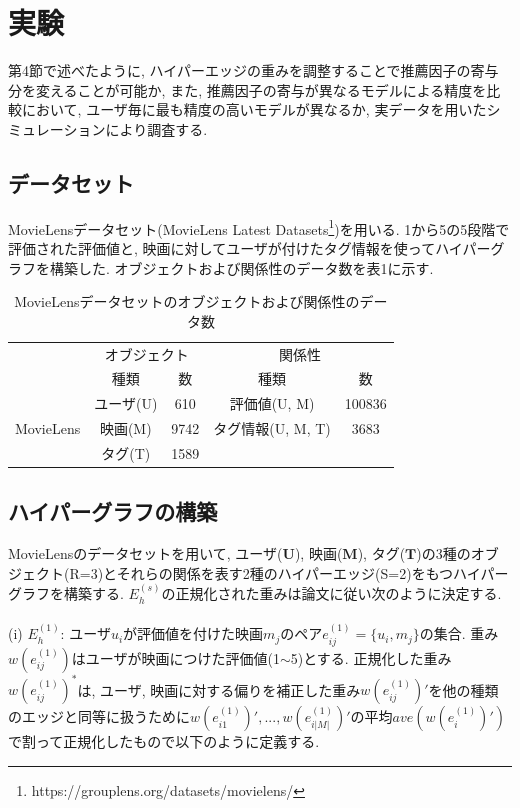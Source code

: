 \documentclass[a4j,11pt]{jarticle}           %
\begin{document}
	\section{実験}
	第4節で述べたように, ハイパーエッジの重みを調整することで推薦因子の寄与分を変えることが可能か, また, 推薦因子の寄与が異なるモデルによる精度を比較において, ユーザ毎に最も精度の高いモデルが異なるか, 実データを用いたシミュレーションにより調査する.
	\subsection{データセット}
	MovieLensデータセット(MovieLens Latest Datasets\footnote{https://grouplens.org/datasets/movielens/})を用いる. 1から5の5段階で評価された評価値と, 映画に対してユーザが付けたタグ情報を使ってハイパーグラフを構築した. オブジェクトおよび関係性のデータ数を表1に示す.%
	
	\begin{table}[H]
		\centering
		\caption{MovieLensデータセットのオブジェクトおよび関係性のデータ数}
		\begin{tabular}{ccccc}\hline
			&\multicolumn{2}{c}{オブジェクト}&\multicolumn{2}{c}{関係性}　\\
			&種類&数&種類&数 \\ \hline
			&ユーザ(U)&610&評価値(U, M)&100836\\
			MovieLens&映画(M)&9742&タグ情報(U, M, T)&3683\\
			&タグ(T)&1589\\ \hline
		\end{tabular}
	\end{table}
	
	\subsection{ハイパーグラフの構築}
	MovieLensのデータセットを用いて, ユーザ($\textbf{U}$), 映画($\textbf{M}$), タグ($\textbf{T}$)の3種のオブジェクト(R=3)とそれらの関係を表す2種のハイパーエッジ(S=2)をもつハイパーグラフを構築する. $E_h^{(s)}$の正規化された重みは論文\cite{MRH}に従い次のように決定する. 
	\\\\(i) $E_h^{(1)}$: ユーザ$u_i$が評価値を付けた映画$m_j$のペア$e^{(1)}_{ij}=\{u_i,m_j\}$の集合. 重み$w(e_{ij}^{(1)})$はユーザが映画につけた評価値(1$\sim$5)とする. 正規化した重み$w(e_{ij}^{(1)})^*$は, ユーザ, 映画に対する偏りを補正した重み$w(e_{ij}^{(1)})'$を他の種類のエッジと同等に扱うために$w(e_{i1}^{(1)})',...,w(e_{i|M|}^{(1)})'$の平均$ave(w(e_i^{(1)})')$で割って正規化したもので以下のように定義する.
	
\end{document}
